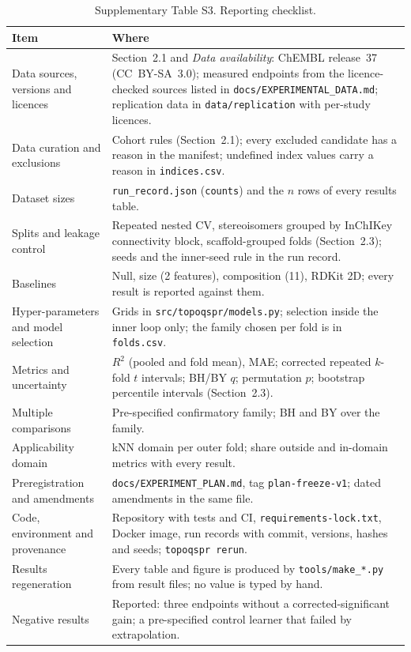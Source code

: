 \documentclass[preprint,12pt]{elsarticle}
\begin{document}
\begin{table}[h]
\centering\footnotesize
\caption{Supplementary Table S3. Reporting checklist.}
\begin{tabular}{p{4.2cm}p{8.8cm}}
\toprule
Item & Where \\
\midrule
Data sources, versions and licences & Section~2.1 and \emph{Data availability}: ChEMBL release~37 (CC~BY-SA~3.0); measured endpoints from the licence-checked sources listed in \texttt{docs/EXPERIMENTAL\_DATA.md}; replication data in \texttt{data/replication} with per-study licences. \\
Data curation and exclusions & Cohort rules (Section~2.1); every excluded candidate has a reason in the manifest; undefined index values carry a reason in \texttt{indices.csv}. \\
Dataset sizes & \texttt{run\_record.json} (\texttt{counts}) and the $n$ rows of every results table. \\
Splits and leakage control & Repeated nested CV, stereoisomers grouped by InChIKey connectivity block, scaffold-grouped folds (Section~2.3); seeds and the inner-seed rule in the run record. \\
Baselines & Null, size (2 features), composition (11), RDKit 2D; every result is reported against them. \\
Hyper-parameters and model selection & Grids in \texttt{src/topoqspr/models.py}; selection inside the inner loop only; the family chosen per fold is in \texttt{folds.csv}. \\
Metrics and uncertainty & $R^2$ (pooled and fold mean), MAE; corrected repeated $k$-fold $t$ intervals; BH/BY $q$; permutation $p$; bootstrap percentile intervals (Section~2.3). \\
Multiple comparisons & Pre-specified confirmatory family; BH and BY over the family. \\
Applicability domain & kNN domain per outer fold; share outside and in-domain metrics with every result. \\
Preregistration and amendments & \texttt{docs/EXPERIMENT\_PLAN.md}, tag \texttt{plan-freeze-v1}; dated amendments in the same file. \\
Code, environment and provenance & Repository with tests and CI, \texttt{requirements-lock.txt}, Docker image, run records with commit, versions, hashes and seeds; \texttt{topoqspr rerun}. \\
Results regeneration & Every table and figure is produced by \texttt{tools/make\_*.py} from result files; no value is typed by hand. \\
Negative results & Reported: three endpoints without a corrected-significant gain; a pre-specified control learner that failed by extrapolation. \\
\bottomrule
\end{tabular}
\end{table}



\end{document}
